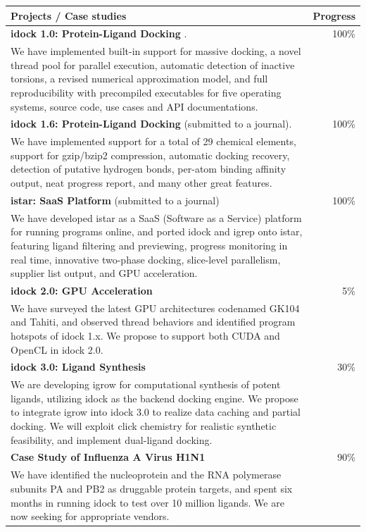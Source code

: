 \begin{table}
\centering
\begin{tabular*}
{\linewidth}
{@{\extracolsep{\fill}}p{}r}
\toprule
Projects / Case studies & Progress \\
\midrule
\textbf{idock 1.0: Protein-Ligand Docking} \citep{1153}. & 100\% \\
We have implemented built-in support for massive docking, a novel thread pool for parallel execution, automatic detection of inactive torsions, a revised numerical approximation model, and full reproducibility with precompiled executables for five operating systems, source code, use cases and API documentations. & \\
\textbf{idock 1.6: Protein-Ligand Docking} (submitted to a journal). & 100\% \\
We have implemented support for a total of 29 chemical elements, support for gzip/bzip2 compression, automatic docking recovery, detection of putative hydrogen bonds, per-atom binding affinity output, neat progress report, and many other great features. & \\
\textbf{istar: SaaS Platform} (submitted to a journal) & 100\% \\
We have developed istar as a SaaS (Software as a Service) platform for running programs online, and ported idock and igrep onto istar, featuring ligand filtering and previewing, progress monitoring in real time, innovative two-phase docking, slice-level parallelism, supplier list output, and GPU acceleration. & \\
\textbf{idock 2.0: GPU Acceleration} & 5\% \\
We have surveyed the latest GPU architectures codenamed GK104 and Tahiti, and observed thread behaviors and identified program hotspots of idock 1.x. We propose to support both CUDA and OpenCL in idock 2.0. & \\
\textbf{idock 3.0: Ligand Synthesis} & 30\% \\
We are developing igrow for computational synthesis of potent ligands, utilizing idock as the backend docking engine. We propose to integrate igrow into idock 3.0 to realize data caching and partial docking. We will exploit click chemistry for realistic synthetic feasibility, and implement dual-ligand docking. & \\
\textbf{Case Study of Influenza A Virus H1N1} & 90\% \\
We have identified the nucleoprotein and the RNA polymerase subunits PA and PB2 as druggable protein targets, and spent six months in running idock to test over 10 million ligands. We are now seeking for appropriate vendors. & \\

\end{tabular*}
\end{table}
